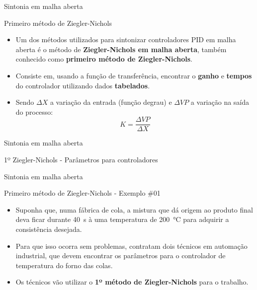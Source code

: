 \begin{frame}{Sintonia em malha aberta}
	\begin{block}{Primeiro método de Ziegler-Nichols}
		\begin{itemize}
			\item Um dos métodos utilizados para sintonizar controladores PID em malha aberta é o método de \textbf{Ziegler-Nichols em malha aberta}, também conhecido como \textbf{primeiro método de Ziegler-Nichols}.
			\item Consiste em, usando a função de transferência, encontrar o \textbf{ganho} e \textbf{tempos} do controlador utilizando dados \textbf{tabelados}.
			\item Sendo $ \Delta X $ a variação da entrada (função degrau) e $ \Delta VP $ a variação na saída do processo: \[ K=\dfrac{\Delta VP}{\Delta X} \]
		\end{itemize}
	\end{block}
\end{frame}


\begin{frame}{Sintonia em malha aberta}
	\begin{block}{1º Ziegler-Nichols - Parâmetros para controladores}
	\end{block}
\end{frame}


\begin{frame}{Sintonia em malha aberta}
	\begin{block}{Primeiro método de Ziegler-Nichols - Exemplo \#01}
		\begin{itemize}
			\item Suponha que, numa fábrica de cola, a mistura que dá origem ao produto final deva ficar durante \SI{40}{\second} à uma temperatura de \SI{200}{\degreeCelsius} para adquirir a consistência desejada.
			\item Para que isso ocorra sem problemas, contratam dois técnicos em automação industrial, que devem encontrar os parâmetros para o controlador de temperatura do forno das colas.
			\item Os técnicos vão utilizar o \textbf{1º método de Ziegler-Nichols} para o trabalho.
		\end{itemize}
	\end{block}
\end{frame}


